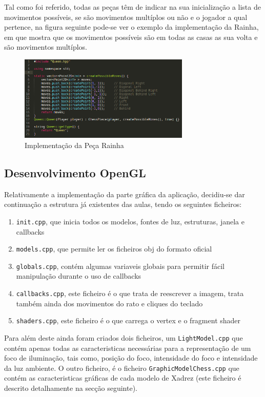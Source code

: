 \documentclass[portugues,final]{revdetua}
\begin{document}
Tal como foi referido, todas as peças têm de indicar na sua inicialização a lista de movimentos possíveis, se são movimentos multíplos ou não e o jogador a qual pertence, na figura seguinte pode-se ver o exemplo da implementação da Rainha, em que mostra que os movimentos possíveis são em todas as casas as sua volta e são movimentos multíplos.

\begin{figure}[H]
\centerline{\includegraphics[width=230pt]{images/queen.png}}
\caption{Implementação da Peça Rainha}
\label{img:complete}
\end{figure}

\subsection{Desenvolvimento OpenGL}

Relativamente a implementação da parte gráfica da aplicação, decidiu-se dar continuação a estrutura já existentes das aulas, tendo os seguintes ficheiros:
\begin{enumerate}
\item{{\tt init.cpp}, que inicia todos os modelos, fontes de luz, estruturas, janela e callbacks}
\item{{\tt models.cpp}, que permite ler os ficheiros obj do formato oficial}
\item{{\tt globals.cpp}, contém algumas variaveis globais para permitir fácil manipulação durante o uso de callbacks}
\item{{\tt callbacks.cpp}, este ficheiro é o que trata de reescrever a imagem, trata também ainda dos movimentos do rato e cliques do teclado}
\item{{\tt shaders.cpp}, este ficheiro é o que carrega o vertex e o fragment shader}
\end{enumerate}

Para além deste ainda foram criados dois ficheiros, um {\tt LightModel.cpp} que contém apenas todas as caracteristicas necessárias para a representação de um foco de iluminação, tais como, posição do foco, intensidade do foco e intensidade da luz ambiente.
O outro ficheiro, é o ficheiro {\tt GraphicModelChess.cpp} que contém as caracteristicas gráficas de cada modelo de Xadrez (este ficheiro é descrito detalhamente na secção seguinte).
\end{document}
